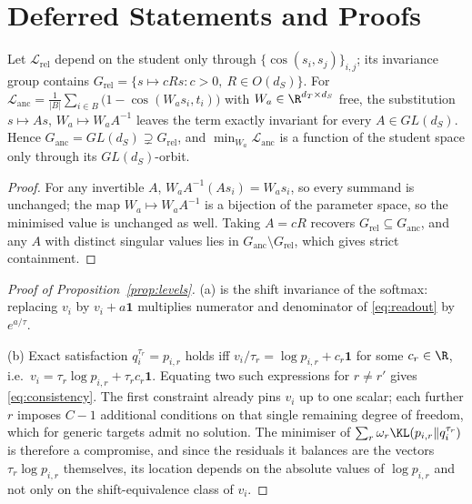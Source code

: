 \section{Deferred Statements and Proofs}
\label{app:proofs}

\begin{lemma}[Gauge]
\label{lem:gauge}
Let $\mathcal{L}_{\mathrm{rel}}$ depend on the student only through
$\{\cos(s_i,s_j)\}_{i,j}$; its invariance group contains
$G_{\mathrm{rel}} = \{s\mapsto cRs : c>0,\ R\in O(d_S)\}$. For
$\mathcal{L}_{\mathrm{anc}} = \frac{1}{|B|}\sum_{i\in B}\big(1-\cos(W_a s_i,t_i)\big)$
with $W_a\in\R^{d_T\times d_S}$ free, the substitution $s\mapsto As$,
$W_a\mapsto W_a A^{-1}$ leaves the term exactly invariant for every $A\in GL(d_S)$. Hence
$G_{\mathrm{anc}} = GL(d_S) \supsetneq G_{\mathrm{rel}}$, and
$\min_{W_a}\mathcal{L}_{\mathrm{anc}}$ is a function of the student space only through its
$GL(d_S)$-orbit.
\end{lemma}

\begin{proof}
For any invertible $A$, $W_a A^{-1}(As_i) = W_a s_i$, so every summand is unchanged; the
map $W_a\mapsto W_aA^{-1}$ is a bijection of the parameter space, so the minimised value is
unchanged as well. Taking $A=cR$ recovers $G_{\mathrm{rel}}\subseteq G_{\mathrm{anc}}$, and
any $A$ with distinct singular values lies in $G_{\mathrm{anc}}\setminus G_{\mathrm{rel}}$,
which gives strict containment.
\end{proof}

\begin{proof}[Proof of Proposition~\ref{prop:levels}]
(a) is the shift invariance of the softmax: replacing $v_i$ by $v_i+a\mathbf{1}$ multiplies
numerator and denominator of \eqref{eq:readout} by $e^{a/\tau}$.

(b) Exact satisfaction $q_i^{\tau_r}=p_{i,r}$ holds iff
$v_i/\tau_r = \log p_{i,r} + c_r\mathbf{1}$ for some $c_r\in\R$, i.e.\
$v_i = \tau_r\log p_{i,r} + \tau_r c_r\mathbf{1}$. Equating two such expressions for
$r\neq r'$ gives \eqref{eq:consistency}. The first constraint already pins $v_i$ up to one
scalar; each further $r$ imposes $C-1$ additional conditions on that single remaining
degree of freedom, which for generic targets admit no solution. The minimiser of
$\sum_r\omega_r\KL(p_{i,r}\Vert q_i^{\tau_r})$ is therefore a compromise, and since the
residuals it balances are the vectors $\tau_r\log p_{i,r}$ themselves, its location depends
on the absolute values of $\log p_{i,r}$ and not only on the shift-equivalence class of
$v_i$.
\end{proof}

